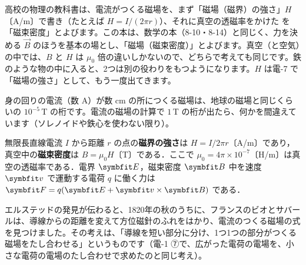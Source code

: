 \label{ph:電-6:BH}高校の物理の教科書は、電流がつくる磁場を、まず「磁場（磁界）の強さ」$H$〔A/m〕で書き（たとえば $H=I/(2\pi r)$）、それに真空の透磁率をかけた
を「磁束密度」とよびます。この本は、数学の本（8-10・8-14）と同じく、力を決める $\vec B$ のほうを基本の場とし、「磁場（磁束密度）」とよびます。真空（と空気）の中では、$B$ と $H$ は $\mu_0$ 倍の違いしかないので、どちらで考えても同じです。鉄のような物の中に入ると、2つは別の役わりをもつようになります。$H$ は電-7 で「磁場の強さ」として、もう一度出てきます。

\begin{phketa}[磁場の強さの目安]
身の回りの電流（数 A）が数 cm の所につくる磁場は、地球の磁場と同じくらいの $10^{-5}$\,T の桁です。電流の磁場の計算で $1$\,T の桁が出たら、何かを間違えています（ソレノイドや鉄心を使わない限り）。
\end{phketa}

\begin{senmonsho}[電気工学の専門書の書き方]
\begin{bkhonbun}
無限長直線電流 $I$ から距離 $r$ の点の\textbf{磁界の強さ}は $H=I/2\pi r$〔A/m〕であり，真空中の\textbf{磁束密度}は $B=\mu_0H$〔T〕である．ここで $\mu_0=4\pi\times10^{-7}$〔H/m〕は真空の透磁率である．電界 $\symbfit E$，磁束密度 $\symbfit B$ 中を速度 $\symbfit v$ で運動する電荷 $q$ に働く力は $\symbfit F=q(\symbfit E+\symbfit v\times\symbfit B)$ である．
\end{bkhonbun}
\end{senmonsho}

\label{ph:電-6:sec4}
エルステッドの発見が伝わると、1820年の秋のうちに、フランスのビオとサバールは、導線からの距離を変えて方位磁針のふれをはかり、電流のつくる磁場の式を見つけました。その考えは、「導線を短い部分に分け、1つ1つの部分がつくる磁場をたし合わせる」というものです（電-1 ⑦で、広がった電荷の電場を、小さな電荷の電場のたし合わせで求めたのと同じ考え）。

